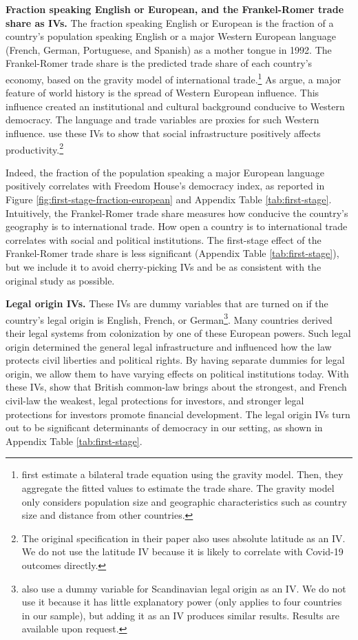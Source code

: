 \textbf{Fraction speaking English or European, and the Frankel-Romer trade share as IVs.} The fraction speaking English or European is the fraction of a country's population speaking English or a major Western European language (French, German, Portuguese, and Spanish) as a mother tongue in 1992. The Frankel-Romer trade share is the predicted trade share of each country's economy, based on the gravity model of international trade.\footnote{\citet{frankelDoesTradeCause1999} first estimate a bilateral trade equation using the gravity model. Then, they aggregate the fitted values to estimate the trade share. The gravity model only considers population size and geographic characteristics such as country size and distance from other countries.} 
As \citet{hallWhyCountriesProduce1999} argue, a major feature of world history is the spread of Western European influence. This influence created an institutional and cultural background conducive to Western democracy. The language and trade variables are proxies for such Western influence. 
\citet{hallWhyCountriesProduce1999} use these IVs to show that social infrastructure positively affects productivity.\footnote{The original specification in their paper also uses absolute latitude as an IV. We do not use the latitude IV because it is likely to correlate with Covid-19 outcomes directly.} 

Indeed, the fraction of the population speaking a major European language positively correlates with Freedom House's democracy index, as reported in Figure \ref{fig:first-stage-fraction-european} and Appendix Table \ref{tab:first-stage}. Intuitively, the Frankel-Romer trade share measures how conducive the country's geography is to international trade. How open a country is to international trade correlates with social and political institutions. The first-stage effect of the Frankel-Romer trade share is less significant (Appendix Table \ref{tab:first-stage}), but we include it to avoid cherry-picking IVs and be as consistent with the original study as possible. 

\textbf{Legal origin IVs.} These IVs are dummy variables that are turned on if the country's legal origin is English, French, or German\footnote{\citet{portaLawFinance1998} also use a dummy variable for Scandinavian legal origin as an IV. We do not use it because it has little explanatory power (only applies to four countries in our sample), but adding it as an IV produces similar results. Results are available upon request.}. Many countries derived their legal systems from colonization by one of these European powers. Such legal origin determined the general legal infrastructure and influenced how the law protects civil liberties and political rights. By having separate dummies for legal origin, we allow them to have varying effects on political institutions today. With these IVs, \citet{portaLawFinance1998} show that British common-law brings about the strongest, and French civil-law the weakest, legal protections for investors, and stronger legal protections for investors promote financial development. The legal origin IVs turn out to be significant determinants of democracy in our setting, as shown in Appendix Table \ref{tab:first-stage}.

